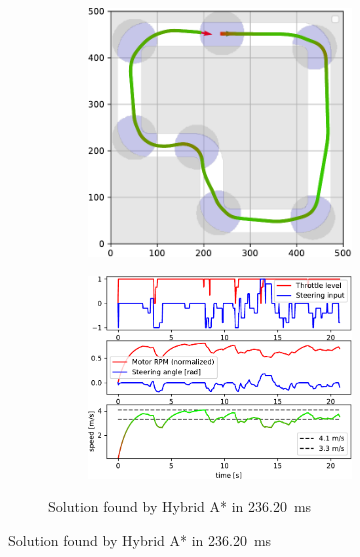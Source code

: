 \begin{figure}[!tbp]%
	\centering
	
	\begin{subfigure}[t]{\textwidth}
		\begin{subfigure}[c]{0.49\textwidth}
			\includegraphics[width=\textwidth]{../img/experiments/simple_hybrid_astar_trajectory}
		\end{subfigure}
		\hfill
		\begin{subfigure}[c]{0.49\textwidth}
			\includegraphics[width=\textwidth]{../img/experiments/simple_hybrid_astar_actuators}
		\end{subfigure}
		\caption{Solution found by Hybrid A* in \SI{236.20}{\milli\second}}
		\label{fig:simple-hybrid_astar}
	\end{subfigure}
	

\end{figure}
